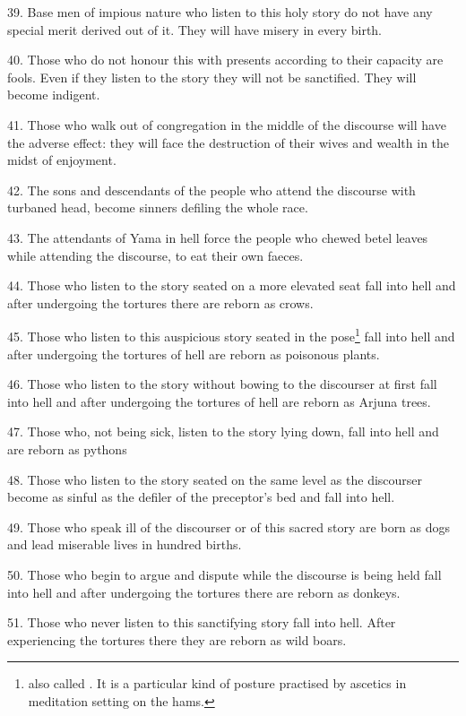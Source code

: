 39. Base men of impious nature who listen to this holy story do not have any
special merit derived out of it. They will have misery in every birth.

40. Those who do not honour this  with presents according to their
capacity are fools. Even if they listen to the story they will not be sanctified.
They will become indigent.

41. Those who walk out of congregation in the middle of the discourse will have
the adverse effect: they will face the destruction of their wives and wealth in
the midst of enjoyment.

42. The sons and descendants of the people who attend the discourse with
turbaned head, become sinners defiling the whole race.

43. The attendants of Yama in hell force the people who chewed betel leaves
while attending the discourse, to eat their own faeces.

44. Those who listen to the story seated on a more elevated seat fall into hell
and after undergoing the tortures there are reborn as crows.

45. Those who listen to this auspicious story seated in the 
pose\footnote{ also called . It is a particular
kind of posture practised by ascetics in meditation setting on the hams.} fall
into hell and after undergoing the tortures of hell are reborn as poisonous
plants.

46. Those who listen to the story without bowing to the discourser at first fall
into hell and after undergoing the tortures of hell are reborn as Arjuna trees.

47. Those who, not being sick, listen to the story lying down, fall into hell
and are reborn as pythons \etc

48. Those who listen to the story seated on the same level as the discourser
become as sinful as the defiler of the preceptor’s bed and fall into hell.

49. Those who speak ill of the discourser or of this sacred story are born as
dogs and lead miserable lives in hundred births.

50. Those who begin to argue and dispute while the discourse is being held fall
into hell and after undergoing the tortures there are reborn as donkeys.

51. Those who never listen to this sanctifying story fall into hell. After
experiencing the tortures there they are reborn as wild boars.


